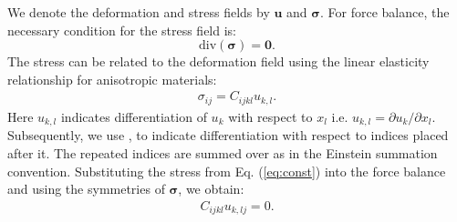 \documentclass[%
reprint,
 amsmath,amssymb,
 aps,
 prb,
]{revtex4-1}
\newcommand*{\rtten}[1]{\mathbf{\boldsymbol{#1}}}
\newcommand*{\rtvec}[1]{\mathbf{#1}}
\begin{document}
We denote the deformation and stress fields by $\rtvec{u}$ and $\rtten{\sigma}$. For force balance, the necessary condition for the stress field is:
\begin{equation}\label{eq:forbal}
\text{div}(\rtten{\sigma})=\rtvec{0}.
\end{equation}
The stress can be related to the deformation field using the linear elasticity relationship for anisotropic materials:
\begin{eqnarray}\label{eq:const}
\sigma_{ij}=C_{ijkl}u_{k,l}.
\end{eqnarray}
Here $u_{k,l}$ indicates differentiation of $u_k$ with respect to $x_l$ i.e. $u_{k,l}=\partial u_k/\partial x_l$. Subsequently, we use , to indicate differentiation with respect to indices placed after it. The repeated indices are summed over as in the Einstein summation convention. Substituting the stress from Eq. (\ref{eq:const}) into the force balance and using the symmetries of $\rtten{\sigma}$, we obtain:
\begin{eqnarray}\label{eq:forbal1}
C_{ijkl}u_{k,lj}=0.
\end{eqnarray}
\end{document}
